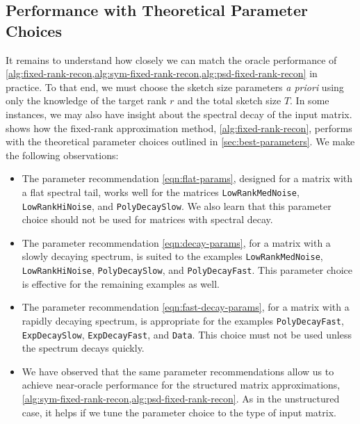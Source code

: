 \documentclass[final]{siamart1116}
\numberwithin{equation}{section}
\numberwithin{theorem}{section}
\numberwithin{figure}{section}
\begin{document}
\subsection{Performance with Theoretical Parameter Choices}
\label{sec:theory-params}

It remains to understand how closely we can match the oracle performance
of \cref{alg:fixed-rank-recon,alg:sym-fixed-rank-recon,alg:psd-fixed-rank-recon}
in practice.  To that end, we must choose the sketch size parameters \emph{a priori}
using only the knowledge of the target rank $r$ and the total sketch size $T$.
In some instances, we may also have insight about the spectral decay of the
input matrix.
 shows how the fixed-rank approximation method, \cref{alg:fixed-rank-recon},
performs with the theoretical parameter choices outlined in \cref{sec:best-parameters}.
We make the following observations:

\vspace{0.5pc}

\begin{itemize} \setlength{\itemsep}{0.5pc}
\item	The parameter recommendation \cref{eqn:flat-params}, designed for a matrix
with a flat spectral tail, works well for the matrices
\texttt{LowRankMedNoise}, \texttt{LowRankHiNoise}, and \texttt{PolyDecaySlow}.
We also learn that this parameter choice should not be used for matrices with spectral decay.

\item	The parameter recommendation \cref{eqn:decay-params}, for a matrix
with a slowly decaying spectrum, is suited to the examples
\texttt{LowRankMedNoise}, \texttt{LowRankHiNoise}, \texttt{PolyDecaySlow}, and \texttt{PolyDecayFast}.
This parameter choice is effective for the remaining examples as well.

\item	The parameter recommendation \cref{eqn:fast-decay-params}, for a matrix
with a rapidly decaying spectrum, is appropriate for the examples
\texttt{PolyDecayFast}, \texttt{ExpDecaySlow}, \texttt{ExpDecayFast}, and \texttt{Data}.
This choice must not be used unless the spectrum decays quickly.

\item	We have observed that the same parameter recommendations allow us to achieve
near-oracle performance for the structured matrix approximations,
\cref{alg:sym-fixed-rank-recon,alg:psd-fixed-rank-recon}.  As in the unstructured
case, it helps if we tune the parameter choice to the type of input matrix.


\end{itemize}
\end{document}
